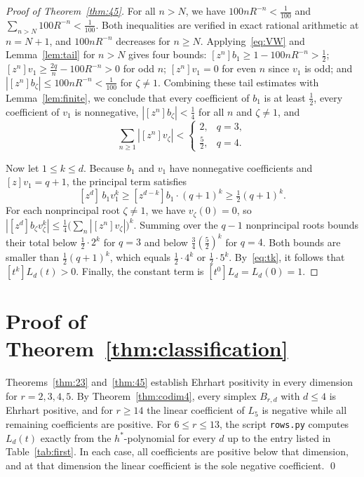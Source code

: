 \documentclass[11pt]{amsart}
\theoremstyle{remark}
\begin{document}
\begin{proof}[Proof of Theorem~\ref{thm:45}]
For all $n>N$, we have $100nR^{-n}<\frac1{100}$ and
$\sum_{n>N}100R^{-n}<\frac1{100}$. Both inequalities are verified in exact
rational arithmetic at $n=N+1$, and $100nR^{-n}$ decreases for $n\ge N$.
Applying~\eqref{eq:VW} and Lemma~\ref{lem:tail} for $n>N$ gives four bounds:
$[z^n]b_1\ge1-100nR^{-n}>\frac12$; $[z^n]v_1\ge\frac{2q}n-100R^{-n}>0$ for odd
$n$; $[z^n]v_1=0$ for even $n$ since $v_1$ is odd; and
$|[z^n]b_\zeta|\le100nR^{-n}<\frac1{100}$ for $\zeta\ne1$. Combining these
tail estimates with Lemma~\ref{lem:finite}, we conclude that every coefficient
of $b_1$ is at least $\frac12$, every coefficient of $v_1$ is nonnegative,
$|[z^n]b_\zeta|<\frac14$ for all $n$ and $\zeta\ne1$, and
\[
 \sum_{n\ge1}|[z^n]v_\zeta|<\begin{cases}2,&q=3,\\ \frac52,&q=4.\end{cases}
\]

Now let $1\le k\le d$. Because $b_1$ and $v_1$ have nonnegative coefficients
and $[z]v_1=q+1$, the principal term satisfies
\[
 [z^d]\,b_1v_1^k\ge[z^{d-k}]b_1\cdot(q+1)^k\ge\tfrac12(q+1)^k.
\]
For each nonprincipal root $\zeta\ne1$, we have $v_\zeta(0)=0$, so
$|[z^d]b_\zeta v_\zeta^k|\le\frac14\bigl(\sum_n|[z^n]v_\zeta|\bigr)^k$.
Summing over the $q-1$ nonprincipal roots bounds their total below
$\frac12\cdot2^k$ for $q=3$ and below $\frac34(\frac52)^k$ for $q=4$. Both
bounds are smaller than $\frac12(q+1)^k$, which equals $\frac12\cdot4^k$ or
$\frac12\cdot5^k$. By~\eqref{eq:tk}, it follows that $[t^k]L_d(t)>0$. Finally,
the constant term is $[t^0]L_d=L_d(0)=1$.
\end{proof}

\section{Proof of Theorem~\ref{thm:classification}}\label{sec:classification}

Theorems~\ref{thm:23} and~\ref{thm:45} establish Ehrhart positivity in every
dimension for $r=2,3,4,5$. By Theorem~\ref{thm:codim4}, every simplex
$B_{r,d}$ with $d\le4$ is Ehrhart positive, and for $r\ge14$ the linear
coefficient of $L_5$ is negative while all remaining coefficients are
positive. For $6\le r\le13$, the script \texttt{rows.py} computes $L_d(t)$
exactly from the $h^*$-polynomial for every $d$ up to the entry listed in
Table~\ref{tab:first}. In each case, all coefficients are positive below that
dimension, and at that dimension the linear coefficient is the sole negative
coefficient. \qed
\end{document}
